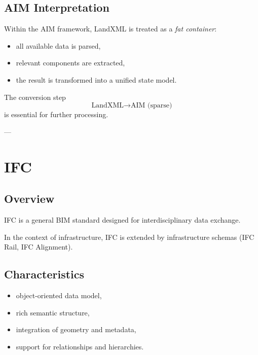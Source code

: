 \subsection{AIM Interpretation}

\begin{remark}
Within the AIM framework, LandXML is treated as a \emph{fat container}:
\begin{itemize}
\item all available data is parsed,
\item relevant components are extracted,
\item the result is transformed into a unified state model.
\end{itemize}
\end{remark}

\begin{remark}
The conversion step
\[
\text{LandXML} \rightarrow \text{AIM (sparse)}
\]
is essential for further processing.
\end{remark}

---

\section{IFC}

\subsection{Overview}

\begin{remark}
IFC is a general BIM standard designed for interdisciplinary data
exchange.
\end{remark}

\begin{remark}
In the context of infrastructure, IFC is extended by infrastructure
schemas (IFC Rail, IFC Alignment).
\end{remark}

\subsection{Characteristics}

\begin{itemize}
\item object-oriented data model,
\item rich semantic structure,
\item integration of geometry and metadata,
\item support for relationships and hierarchies.
\end{itemize}

